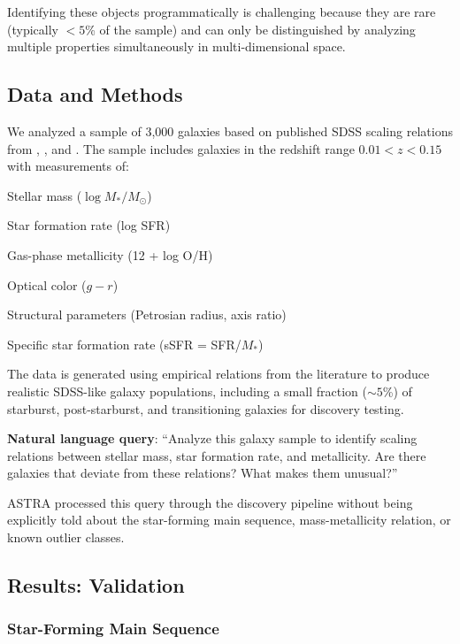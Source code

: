 \documentclass[usenatbib]{rasti}
\begin{document}
Identifying these objects programmatically is challenging because they are rare (typically $<5$\% of the sample) and can only be distinguished by analyzing multiple properties simultaneously in multi-dimensional space.

\subsection{Data and Methods}

We analyzed a sample of 3,000 galaxies based on published SDSS scaling relations from \citet{kauffmann2003}, \citet{tremonti2004}, and \citet{brinchmann2004}. The sample includes galaxies in the redshift range $0.01 < z < 0.15$ with measurements of:
\begin{description}
\item Stellar mass ($\log M_*/M_\odot$)
\item Star formation rate (log SFR)
\item Gas-phase metallicity (12 + log O/H)
\item Optical color ($g-r$)
\item Structural parameters (Petrosian radius, axis ratio)
\item Specific star formation rate (sSFR = SFR/$M_*$)
\end{description}

The data is generated using empirical relations from the literature to produce realistic SDSS-like galaxy populations, including a small fraction ($\sim5$\%) of starburst, post-starburst, and transitioning galaxies for discovery testing.

\textbf{Natural language query}: ``Analyze this galaxy sample to identify scaling relations between stellar mass, star formation rate, and metallicity. Are there galaxies that deviate from these relations? What makes them unusual?''

ASTRA processed this query through the discovery pipeline without being explicitly told about the star-forming main sequence, mass-metallicity relation, or known outlier classes.

\subsection{Results: Validation}

\subsubsection{Star-Forming Main Sequence}
\end{document}
